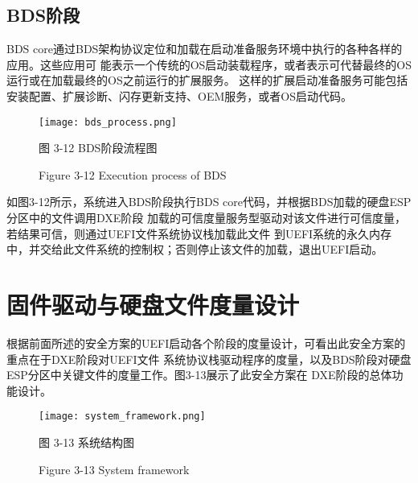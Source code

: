 \subsection{BDS阶段}
BDS core通过BDS架构协议定位和加载在启动准备服务环境中执行的各种各样的应用。这些应用可
能表示一个传统的OS启动装载程序，或者表示可代替最终的OS运行或在加载最终的OS之前运行的扩展服务。
这样的扩展启动准备服务可能包括安装配置、扩展诊断、闪存更新支持、OEM服务，或者OS启动代码。

\begin{figure}[htb]
    \label{ffs_format}
    \vspace{0cm}   
    \setlength{\abovecaptionskip}{0.3cm}
	\centering
    \texttt{[image: bds\_process.png]}
    \caption*{图 3-12 BDS阶段流程图}
    \setlength{\belowcaptionskip}{-0.7cm}
    \caption*{Figure 3-12 Execution process of BDS}
\end{figure}

如图3-12所示，系统进入BDS阶段执行BDS core代码，并根据BDS加载的硬盘ESP分区中的文件调用DXE阶段
加载的可信度量服务型驱动对该文件进行可信度量，若结果可信，则通过UEFI文件系统协议栈加载此文件
到UEFI系统的永久内存中，并交给此文件系统的控制权；否则停止该文件的加载，退出UEFI启动。

%
%
\section{固件驱动与硬盘文件度量设计}
根据前面所述的安全方案的UEFI启动各个阶段的度量设计，可看出此安全方案的重点在于DXE阶段对UEFI文件
系统协议栈驱动程序的度量，以及BDS阶段对硬盘ESP分区中关键文件的度量工作。图3-13展示了此安全方案在
DXE阶段的总体功能设计。

\begin{figure}[htb]
    \label{ffs_format}
    \vspace{0cm}   
    \setlength{\abovecaptionskip}{0.3cm}
	\centering
    \texttt{[image: system\_framework.png]}
    \caption*{图 3-13 系统结构图}
    \setlength{\belowcaptionskip}{-0.7cm}
    \caption*{Figure 3-13 System framework}
\end{figure}

